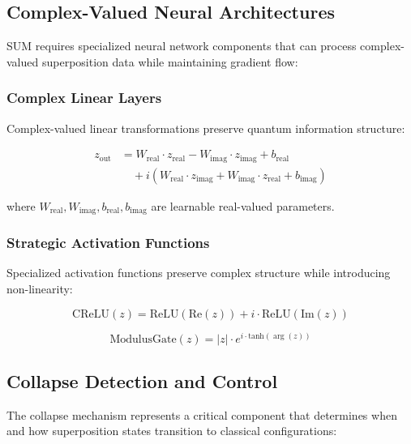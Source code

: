 \documentclass[11pt,a4paper]{article}
\begin{document}
\subsection{Complex-Valued Neural Architectures}

SUM requires specialized neural network components that can process complex-valued superposition data while maintaining gradient flow:

\subsubsection{Complex Linear Layers}

Complex-valued linear transformations preserve quantum information structure:

\begin{align}
z_{\text{out}} &= W_{\text{real}} \cdot z_{\text{real}} - W_{\text{imag}} \cdot z_{\text{imag}} + b_{\text{real}} \\
&\quad + i(W_{\text{real}} \cdot z_{\text{imag}} + W_{\text{imag}} \cdot z_{\text{real}} + b_{\text{imag}})
\end{align}

where $W_{\text{real}}, W_{\text{imag}}, b_{\text{real}}, b_{\text{imag}}$ are learnable real-valued parameters.

\subsubsection{Strategic Activation Functions}

Specialized activation functions preserve complex structure while introducing non-linearity:

\begin{equation}
\text{CReLU}(z) = \text{ReLU}(\text{Re}(z)) + i \cdot \text{ReLU}(\text{Im}(z))
\end{equation}

\begin{equation}
\text{ModulusGate}(z) = |z| \cdot e^{i \cdot \text{tanh}(\arg(z))}
\end{equation}

\subsection{Collapse Detection and Control}

The collapse mechanism represents a critical component that determines when and how superposition states transition to classical configurations:
\end{document}
